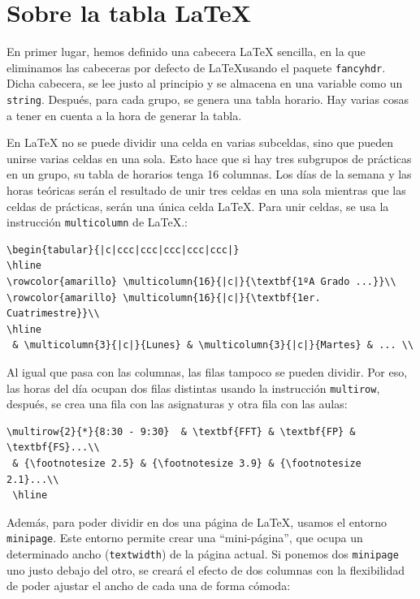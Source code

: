 \section{Sobre la tabla \LaTeX}
En primer lugar, hemos definido una cabecera \LaTeX\; sencilla, en la que eliminamos las cabeceras por defecto de \LaTeX usando el paquete \texttt{fancyhdr}. Dicha cabecera, se lee justo al principio y se almacena en una variable como un \texttt{string}. Después, para cada grupo, se genera una tabla horario. Hay varias cosas a tener en cuenta a la hora de generar la tabla.

En \LaTeX\; no se puede dividir una celda en varias subceldas, sino que pueden unirse varias celdas en una sola. Esto hace que si hay tres subgrupos de prácticas en un grupo, su tabla de horarios tenga 16 columnas. Los días de la semana y las horas teóricas serán el resultado de unir tres celdas en una sola mientras que las celdas de prácticas, serán una única celda \LaTeX. Para unir celdas, se usa la instrucción \texttt{multicolumn} de \LaTeX.:

\begin{verbatim}
\begin{tabular}{|c|ccc|ccc|ccc|ccc|ccc|}
\hline
\rowcolor{amarillo} \multicolumn{16}{|c|}{\textbf{1ºA Grado ...}}\\ 
\rowcolor{amarillo} \multicolumn{16}{|c|}{\textbf{1er. Cuatrimestre}}\\ 
\hline 
 & \multicolumn{3}{|c|}{Lunes} & \multicolumn{3}{|c|}{Martes} & ... \\
\end{verbatim}

Al igual que pasa con las columnas, las filas tampoco se pueden dividir. Por eso, las horas del día ocupan dos filas distintas usando la instrucción \texttt{multirow}, después, se crea una fila con las asignaturas y otra fila con las aulas:

\begin{verbatim}
\multirow{2}{*}{8:30 - 9:30}  & \textbf{FFT} & \textbf{FP} & \textbf{FS}...\\ 
 & {\footnotesize 2.5} & {\footnotesize 3.9} & {\footnotesize 2.1}...\\ 
 \hline
\end{verbatim}

Además, para poder dividir en dos una página de \LaTeX, usamos el entorno \texttt{minipage}. Este entorno permite crear una ``mini-página'', que ocupa un determinado ancho (\texttt{textwidth}) de la página actual. Si ponemos dos \texttt{minipage} uno justo debajo del otro, se creará el efecto de dos columnas con la flexibilidad de poder ajustar el ancho de cada una de forma cómoda:

